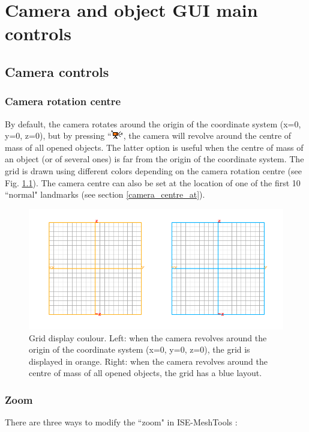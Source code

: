 \chapter{Camera and object GUI main controls}
\minitoc  

 \section{Camera controls}
\subsection{Camera rotation centre}
By default, the camera rotates around the origin of the coordinate system (x=0, y=0, z=0), but by pressing ``\includegraphics[scale=0.7]{images/pixmap/Move_cam.png}", the camera will revolve around the centre of mass of all opened objects. The latter option is useful when the centre of mass of an object (or of several ones) is far from the origin of the coordinate system. The grid is drawn using different colors depending on the camera rotation centre (see Fig. \ref{grid_color}). The camera centre can also be set at the location of one of the first 10 ``normal" landmarks (see section \ref{camera_centre_at}).

\begin{figure}
  \centering
  \includegraphics[scale=0.4]{images/GUI/Camera_rotation_centre.png} 
	\caption{Grid display coulour. Left: when the camera revolves around the origin of the coordinate system (x=0, y=0, z=0), the grid is displayed in orange. Right: when the camera revolves around the centre of mass of all opened objects, the grid has a blue layout.}
\label{grid_color}
 
\end{figure}

\subsection{Zoom}
There are three ways to modify the ``zoom" in ISE-MeshTools :


